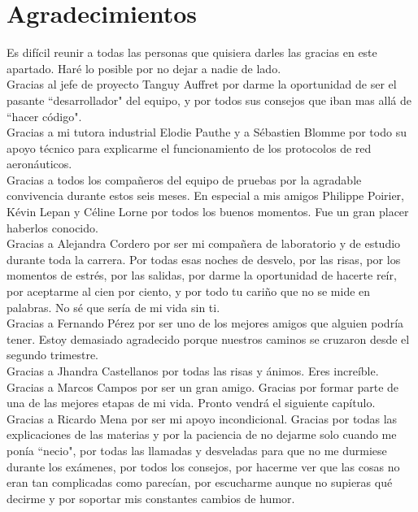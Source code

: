 
\chapter*{Agradecimientos}

Es difícil reunir a todas las personas que quisiera darles las gracias en este apartado. Haré lo posible por no dejar a nadie de lado. \\

Gracias al jefe de proyecto Tanguy Auffret por darme la oportunidad de ser el pasante ``desarrollador"  del equipo, y por todos sus consejos que iban mas allá de ``hacer código". \\

Gracias a mi tutora industrial Elodie Pauthe y a Sébastien Blomme por todo su apoyo técnico para explicarme el funcionamiento de los protocolos de red aeronáuticos. \\

Gracias a todos los compañeros del equipo de pruebas por la agradable convivencia durante estos seis meses. En especial a mis amigos Philippe Poirier, Kévin Lepan y Céline Lorne por todos los buenos momentos. Fue un gran placer haberlos conocido. \\

Gracias a Alejandra Cordero por ser mi compañera de laboratorio y de estudio durante toda la carrera. Por todas esas noches de desvelo, por las risas, por los momentos de estrés, por las salidas, por darme la oportunidad de hacerte reír, por aceptarme al cien por ciento, y por todo tu cariño que no se mide en palabras. No sé que sería de mi vida sin ti. \\

Gracias a Fernando Pérez por ser uno de los mejores amigos que alguien podría tener. Estoy demasiado agradecido porque nuestros caminos se cruzaron desde el segundo trimestre. \\

Gracias a Jhandra Castellanos por todas las risas y ánimos. Eres increíble. \\

Gracias a Marcos Campos por ser un gran amigo. Gracias por formar parte de una de las mejores etapas de mi vida. Pronto vendrá el siguiente capítulo. \\

Gracias a Ricardo Mena por ser mi apoyo incondicional. Gracias por todas las explicaciones de las materias y por la paciencia de no dejarme solo cuando me ponía ``necio", por todas las llamadas y desveladas para que no me durmiese durante los exámenes, por todos los consejos, por hacerme ver que las cosas no eran tan complicadas como parecían, por escucharme aunque no supieras qué decirme y por soportar mis constantes cambios de humor. \\

